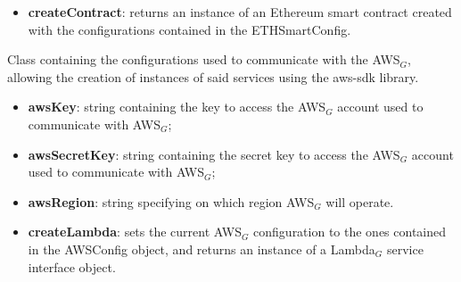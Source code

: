 	\begin{itemize}
		\item \textbf{createContract}: returns an instance of an Ethereum smart contract created with the configurations contained in the ETHSmartConfig.
	\end{itemize}
	Class containing the configurations used to communicate with the AWS$_{G}$, allowing the creation of instances of said services using the aws-sdk library.
	\begin{itemize}
		\item \textbf{awsKey}: string containing the key to access the AWS$_{G}$ account used to communicate with AWS$_{G}$;
		\item \textbf{awsSecretKey}: string containing the secret key to access the AWS$_{G}$ account used to communicate with AWS$_{G}$;
		\item \textbf{awsRegion}: string specifying on which region AWS$_{G}$ will operate.
	\end{itemize}
	\begin{itemize}
		\item \textbf{createLambda}: sets the current AWS$_{G}$ configuration to the ones contained in the AWSConfig object, and returns an instance of a Lambda$_{G}$ service interface object.
	\end{itemize}
